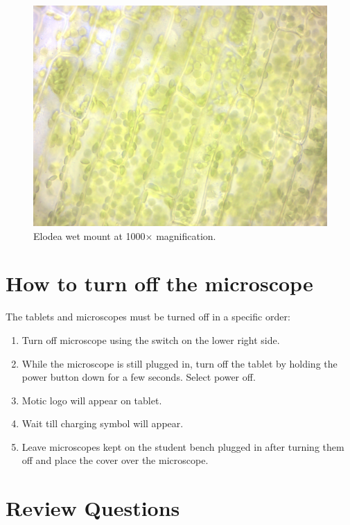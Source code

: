 \begin{figure}

{\centering \includegraphics[width=0.7\linewidth]{./figures/microscope/elodea}

}

\caption{Elodea wet mount at 1000× magnification.}\label{fig:elodea}
\end{figure}


\section{How to turn off the
microscope}\label{how-to-turn-off-the-microscope}

The tablets and microscopes must be turned off in a specific order:

\begin{enumerate}
\def\labelenumi{\arabic{enumi}.}
\tightlist
\item
  Turn off microscope using the switch on the lower right side.
\item
  While the microscope is still plugged in, turn off the tablet by
  holding the power button down for a few seconds. Select power off.
\item
  Motic logo will appear on tablet.
\item
  Wait till charging symbol will appear.
\item
  Leave microscopes kept on the student bench plugged in after turning
  them off and place the cover over the microscope.
\end{enumerate}

\section{Review Questions}\label{review-questions}

